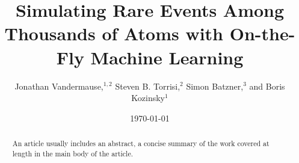 \documentclass[%
    reprint,
    amsmath,amssymb,
    aps,
   ]{revtex4-1}
\begin{document}
   
   
   \title{Simulating Rare Events Among Thousands of Atoms with On-the-Fly
   Machine Learning}%
   
   \author{Jonathan Vandermause,$^{1,2}$ Steven B. Torrisi,$^{2}$
           Simon Batzner,$^{3}$ and Boris Kozinsky$^{1}$}

   
   
   
   
   \date{\today}%
   
   \begin{abstract}
   An article usually includes an abstract, a concise summary of the work
   covered at length in the main body of the article. 
   \end{abstract}
   
\end{document}
